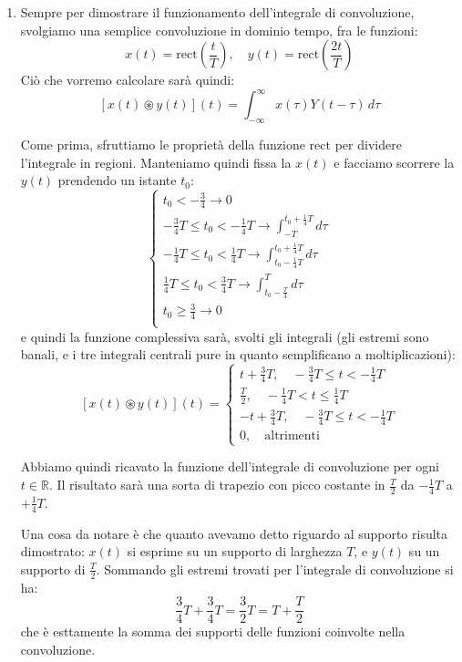 \documentclass[a4paper,11pt]{article}
\begin{document}
\begin{enumerate}
	\item Sempre per dimostrare il funzionamento dell'integrale di convoluzione, svolgiamo una semplice convoluzione in dominio tempo, fra le funzioni:
$$
x(t) = \mathrm{rect} \left( \frac{t}{T} \right), \quad y(t) = \mathrm{rect} \left( \frac{2t}{T} \right)
$$
Ciò che vorremo calcolare sarà quindi:
$$
\left[ x(t) \circledast y(t) \right] (t) = \int_{-\infty}^{\infty} x(\tau) Y(t - \tau) \, d\tau
$$

Come prima, sfruttiamo le proprietà della funzione $\mathrm{rect}$ per dividere l'integrale in regioni. Manteniamo quindi fissa la $x(t)$ e facciamo scorrere la $y(t)$ prendendo un istante $t_0$:
$$
\begin{cases}
t_0 < -\frac{3}{4} \rightarrow 0 \\
-\frac{3}{4}T \leq t_0 < -\frac{1}{4}T \rightarrow \int_{-T}^{t_0 + \frac{1}{4}T} d\tau \\
-\frac{1}{4}T \leq t_0 < \frac{1}{4}T \rightarrow \int_{t_0 - \frac{1}{4}T}^{t_0 + \frac{1}{4}T} d\tau \\
\frac{1}{4}T \leq t_0 < \frac{3}{4}T \rightarrow \int_{t_0 - \frac{T}{4}}^{T} d\tau \\
t_0 \geq \frac{3}{4} \rightarrow 0 \\
\end{cases}
$$
e quindi la funzione complessiva sarà, svolti gli integrali (gli estremi sono banali, e i tre integrali centrali pure in quanto semplificano a moltiplicazioni):
$$
\left[ x(t) \circledast y(t) \right] (t) = 
\begin{cases}
t + \frac{3}{4}T, \quad -\frac{3}{4}T \leq t<-\frac{1}{4}T \\
\frac{T}{2}, \quad -\frac{1}{4}T<t \leq \frac{1}{4}T \\
-t + \frac{3}{4}T, \quad -\frac{3}{4}T \leq t<-\frac{1}{4}T \\
0, \quad \text{altrimenti}
\end{cases}
$$

Abbiamo quindi ricavato la funzione dell'integrale di convoluzione per ogni $t \in \mathbb{R}$. Il risultato sarà una sorta di trapezio con picco costante in $\frac{T}{2}$ da $-\frac{1}{4}T$ a $+\frac{1}{4}T$.

Una cosa da notare è che quanto avevamo detto riguardo al supporto risulta dimostrato: $x(t)$ si esprime su un supporto di larghezza $T$, e $y(t)$ su un supporto di $\frac{T}{2}$. Sommando gli estremi trovati per l'integrale di convoluzione si ha:
$$
\frac{3}{4}T + \frac{3}{4}T = \frac{3}{2}T = T + \frac{T}{2}
$$
che è esttamente la somma dei supporti delle funzioni coinvolte nella convoluzione.

\end{enumerate}
\end{document}
